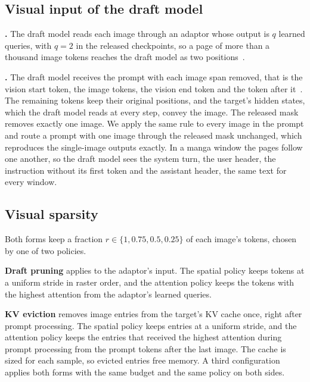 \subsection{Visual input of the draft model}
\label{sec:drafters}

\noindent\textbf{\vispec.}
The \vispec draft model reads each image through an adaptor whose output is $q$ learned queries, with $q = 2$ in the released checkpoints, so a page of more than a thousand image tokens reaches the draft model as two positions~\cite{kang2025vispec}.

\noindent\textbf{\hivis.}
The \hivis draft model receives the prompt with each image span removed, that is the vision start token, the image tokens, the vision end token and the token after it~\cite{xie2025hivis}.
The remaining tokens keep their original positions, and the target's hidden states, which the draft model reads at every step, convey the image.
The released mask removes exactly one image.
We apply the same rule to every image in the prompt and route a prompt with one image through the released mask unchanged, which reproduces the single-image outputs exactly.
In a manga window the pages follow one another, so the draft model sees the system turn, the user header, the instruction without its first token and the assistant header, the same text for every window.

\subsection{Visual sparsity}
\label{sec:sparsity}

Both forms keep a fraction $r \in \{1, 0.75, 0.5, 0.25\}$ of each image's tokens, chosen by one of two policies.

\noindent\textbf{Draft pruning} applies to the \vispec adaptor's input.
The spatial policy keeps tokens at a uniform stride in raster order, and the attention policy keeps the tokens with the highest attention from the adaptor's learned queries.

\noindent\textbf{KV eviction} removes image entries from the target's KV cache once, right after prompt processing.
The spatial policy keeps entries at a uniform stride, and the attention policy keeps the entries that received the highest attention during prompt processing from the prompt tokens after the last image.
The cache is sized for each sample, so evicted entries free memory.
A third configuration applies both forms with the same budget and the same policy on both sides.

